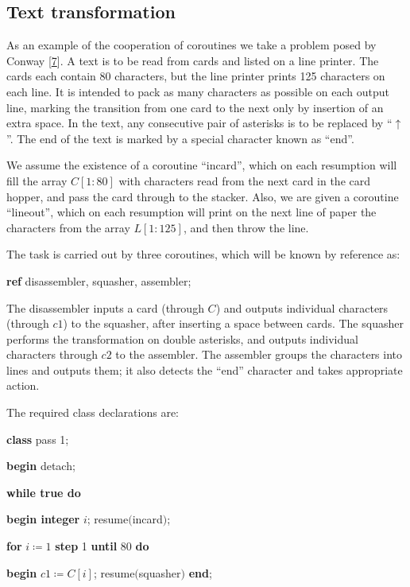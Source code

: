 \subsection{Text transformation}

As an example of the cooperation of coroutines we take a problem posed by Conway [\hyperref[ref:7]{7}]. A text is to be read from cards and listed on a line printer. The cards each contain 80 characters, but the line printer prints 125 characters on each line. It is intended to pack as many characters as possible on each output line, marking the transition from one card to the next only by insertion of an extra space. In the text, any consecutive pair of asterisks is to be replaced by ``$\uparrow$''. The end of the text is marked by a special character known as ``end''.

We assume the existence of a coroutine ``incard'', which on each resumption will fill the array $C[1 : 80]$ with characters read from the next card in the card hopper, and pass the card through to the stacker. Also, we are given a coroutine ``lineout'', which on each resumption will print on the next line of paper the characters from the array $L[1 : 125]$, and then throw the line.

The task is carried out by three coroutines, which will be known by reference as:

\quad \textbf{ref} disassembler, squasher, assembler;

The disassembler inputs a card (through $C$) and outputs individual characters (through $c1$) to the squasher, after inserting a space between cards. The squasher performs the transformation on double asterisks, and outputs individual characters through $c2$ to the assembler. The assembler groups the characters into lines and outputs them; it also detects the ``end'' character and takes appropriate action.

The required class declarations are:

\quad \textbf{class} pass 1;

\quad \textbf{begin} detach;

\quad \quad \textbf{while true do}

\quad \quad \quad \textbf{begin integer} $i$; resume$($incard$)$;

\quad \quad \quad \quad \textbf{for} $i\coloneq 1$ \textbf{step} 1 \textbf{until} 80 \textbf{do}

\quad \quad \quad \quad \quad \textbf{begin} $c1\coloneq C[i]$; resume$($squasher$)$ \textbf{end};

